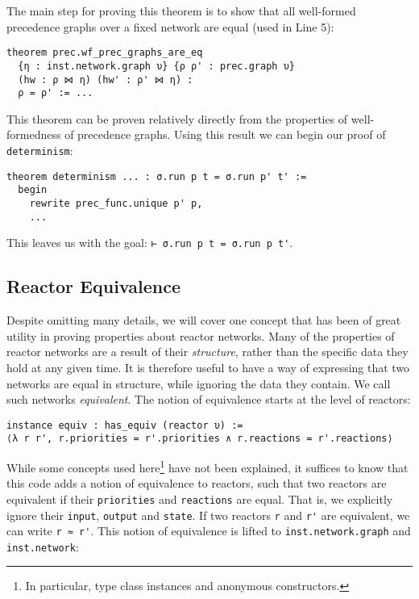 \noindent The main step for proving this theorem is to show that all well-formed precedence graphs over a fixed network are equal (used in Line 5):

\begin{lstlisting}
theorem prec.wf_prec_graphs_are_eq 
  {η : inst.network.graph υ} {ρ ρ' : prec.graph υ} 
  (hw : ρ ⋈ η) (hw' : ρ' ⋈ η) :
  ρ = ρ' := ...
\end{lstlisting}

\noindent This theorem can be proven relatively directly from the properties of well-formedness of precedence graphs.
Using this result we can begin our proof of \lstinline{determinism}:

\begin{lstlisting}
theorem determinism ... : σ.run p t = σ.run p' t' := 
  begin
    rewrite prec_func.unique p' p,
    ...
\end{lstlisting}

\noindent This leaves us with the goal: \lstinline{⊢ σ.run p t = σ.run p t'}.

\subsection{Reactor Equivalence}
\label{section:equiv}

Despite omitting many details, we will cover one concept that has been of great utility in proving properties about reactor networks.
Many of the properties of reactor networks are a result of their \emph{structure}, rather than the specific data they hold at any given time.
It is therefore useful to have a way of expressing that two networks are equal in structure, while ignoring the data they contain.
We call such networks \emph{equivalent}.
The notion of equivalence starts at the level of reactors:

\begin{lstlisting}
instance equiv : has_equiv (reactor υ) := 
⟨λ r r', r.priorities = r'.priorities ∧ r.reactions = r'.reactions⟩
\end{lstlisting}

\noindent While some concepts used here\footnote{In particular, type class instances and anonymous constructors.} have not been explained, it suffices to know that this code adds a notion of equivalence to reactors, such that two reactors are equivalent if their \lstinline{priorities} and \lstinline{reactions} are equal.
That is, we explicitly ignore their \lstinline{input}, \lstinline{output} and \lstinline{state}.
If two reactors \lstinline{r} and \lstinline{r'} are equivalent, we can write \lstinline{r ≈ r'}.
This notion of equivalence is lifted to \lstinline{inst.network.graph} and \lstinline{inst.network}:

